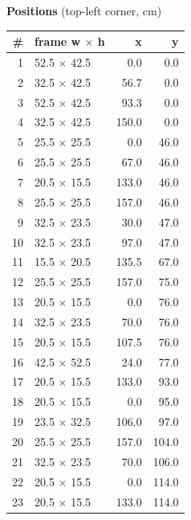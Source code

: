 \documentclass[a4paper,landscape,10pt]{article}
\begin{document}
\begin{minipage}[t]{0.25\textwidth}
\vspace{8pt}
{\bfseries Positions} (top-left corner, cm)\\[2pt]
\tiny
\begin{tabular}{@{}r l r r@{}}
\toprule
\# & frame w $\times$ h & x & y \\
\midrule
1 & 52.5 $\times$ 42.5 & 0.0 & 0.0 \\
2 & 32.5 $\times$ 42.5 & 56.7 & 0.0 \\
3 & 52.5 $\times$ 42.5 & 93.3 & 0.0 \\
4 & 32.5 $\times$ 42.5 & 150.0 & 0.0 \\
5 & 25.5 $\times$ 25.5 & 0.0 & 46.0 \\
6 & 25.5 $\times$ 25.5 & 67.0 & 46.0 \\
7 & 20.5 $\times$ 15.5 & 133.0 & 46.0 \\
8 & 25.5 $\times$ 25.5 & 157.0 & 46.0 \\
9 & 32.5 $\times$ 23.5 & 30.0 & 47.0 \\
10 & 32.5 $\times$ 23.5 & 97.0 & 47.0 \\
11 & 15.5 $\times$ 20.5 & 135.5 & 67.0 \\
12 & 25.5 $\times$ 25.5 & 157.0 & 75.0 \\
13 & 20.5 $\times$ 15.5 & 0.0 & 76.0 \\
14 & 32.5 $\times$ 23.5 & 70.0 & 76.0 \\
15 & 20.5 $\times$ 15.5 & 107.5 & 76.0 \\
16 & 42.5 $\times$ 52.5 & 24.0 & 77.0 \\
17 & 20.5 $\times$ 15.5 & 133.0 & 93.0 \\
18 & 20.5 $\times$ 15.5 & 0.0 & 95.0 \\
19 & 23.5 $\times$ 32.5 & 106.0 & 97.0 \\
20 & 25.5 $\times$ 25.5 & 157.0 & 104.0 \\
21 & 32.5 $\times$ 23.5 & 70.0 & 106.0 \\
22 & 20.5 $\times$ 15.5 & 0.0 & 114.0 \\
23 & 20.5 $\times$ 15.5 & 133.0 & 114.0 \\
\bottomrule
\end{tabular}
\end{minipage}
\clearpage
\end{document}
